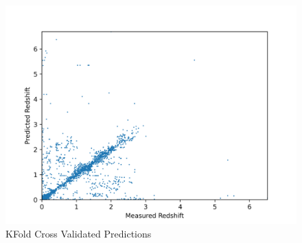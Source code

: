 \documentclass{beamer}
\begin{document}
\begin{frame}
    \begin{figure}
        \includegraphics[scale=0.5]{img/Tree_Result.png}
        \caption*{KFold Cross Validated Predictions}
    \end{figure}
    \end{frame}
\end{document}
